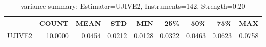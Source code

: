 \begin{table}[ht]
\centering
\caption{variance summary: Estimator=UJIVE2, Instruments=142, Strength=0.20}
\begin{tabular}{lrrrrrrrr}
\toprule
 & COUNT & MEAN & STD & MIN & 25\% & 50\% & 75\% & MAX \\
\midrule
UJIVE2 & 10.0000 & 0.0454 & 0.0212 & 0.0128 & 0.0322 & 0.0463 & 0.0623 & 0.0758 \\
\bottomrule
\end{tabular}
\end{table}
